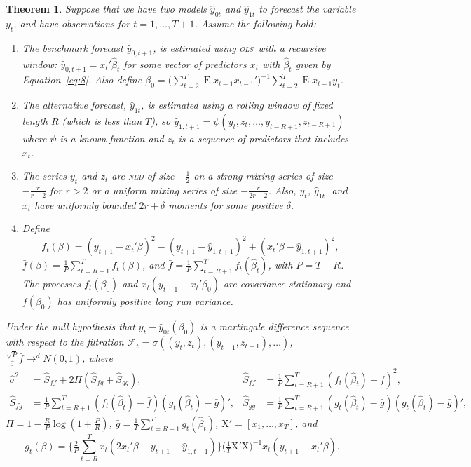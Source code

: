 \documentclass[10pt,fleqn,draft]{article}
\newtheorem{thm}{Theorem}
\theoremstyle{definition}
\DeclareMathOperator{\E}{E}
\newcommand{\X}{\ensuremath{\mathrm{X}}}
\newcommand{\ned}{\textsc{ned}}
\newcommand{\ols}{\textsc{ols}}
\begin{document}
\begin{thm}\label{res:1}
  Suppose that we have two models $\hat{y}_{0t}$ and $\hat{y}_{1t}$ to
  forecast the variable $y_t$, and have observations for
  $t=1,\dots,T+1$.  Assume the following hold:
  \begin{enumerate}
  \item \label{item:1} The benchmark forecast $\hat{y}_{0,t+1}$, is
    estimated using \ols\ with a recursive window: $\hat{y}_{0,t+1} =
    x_t'\hat{\beta}_t$ for some vector of predictors $x_t$ with
    $\hat{\beta}_t$ given by Equation~\eqref{eq:8}.  Also define
    $\beta_0 = \big(\sum_{t=2}^{T} \E x_{t-1} x_{t-1}'\big)^{-1}
    \sum_{t=2}^T \E x_{t-1} y_t$.
  \item \label{item:2} The alternative forecast, $\hat{y}_{1t}$, is
    estimated using a rolling window of fixed length $R$ (which is
    less than $T$), so $\hat{y}_{1,t+1} =
    \psi(y_t,z_t,\dots,y_{t-R+1}, z_{t-R+1})$ where $\psi$ is a known
    function and $z_t$ is a sequence of predictors that includes
    $x_t$.
  \item \label{item:3} The series $y_t$ and $z_t$ are \textsl{\ned} of size
    $-\frac12$ on a strong mixing series of size $-\frac{r}{r-2}$ for $r>2$ or a
    uniform mixing series of size $-\frac{r}{2r-2}$.  Also, $y_t$,
    $\hat{y}_{1t}$, and $x_t$ have uniformly bounded $2 r+\delta$
    moments for some positive $\delta$.
  \item \label{item:4} Define \[f_t(\beta) = (y_{t+1} - x_t'\beta)^2 -
    (y_{t+1} - \hat{y}_{1,t+1})^2 + (x_t'\beta - \hat{y}_{1,t+1})^2,\]
    $\bar{f}(\beta) = \tfrac1P \sum_{t=R+1}^T f_t(\beta)$, and $\bar f =
    \tfrac1P \sum_{t=R+1}^{T} f_t(\hat{\beta}_t)$, with $P = T - R$. The
    processes $f_t(\beta_0)$ and $x_t(y_{t+1} - x_t'\beta_0)$ are
    covariance stationary and $\bar f(\beta_0)$ has uniformly positive
    long run variance.
  \end{enumerate}
  Under the null hypothesis that $y_t - \hat{y}_{0t}(\beta_0)$ is a
  martingale difference sequence with respect to the filtration
  $\mathcal{F}_t = \sigma((y_t, z_{t}), (y_{t-1}, z_{t-1}),\dots)$,
  $\tfrac{\sqrt{P}}{\hat\sigma} \bar f \to^d N(0,1)$, where 
  \begin{align*}
    \hat{\sigma}^2 &= \hat{S}_{ff} + 2 \Pi (\hat{S}_{fg} + \hat{S}_{gg}), &
    \hat{S}_{ff} &= \tfrac1P \sum_{t=R+1}^T (f_t(\hat{\beta}_t) - \bar
    f)^2, \\
    \hat{S}_{fg} &= \tfrac1P \sum_{t=R+1}^T (f_t(\hat{\beta}_t) -
    \bar{f})(g_t(\hat{\beta}_t) - \bar g)', &
    \hat{S}_{gg} &= \tfrac1P \sum_{t=R+1}^T (g_t(\hat{\beta}_t) - \bar
    g)(g_t(\hat{\beta}_t) - \bar g)',
  \end{align*}
  $\Pi = 1 - \tfrac{R}{P} \log(1 + \tfrac{P}{R})$, $\bar{g} = \tfrac1T
  \sum_{t=R+1}^T g_t(\hat{\beta}_t)$, $\X' = [x_1,\dots,x_T]$, and
  \begin{equation*}
    g_t(\beta) = \Big\{\tfrac{2}{P}\sum_{t=R}^T x_t (2 x_t'\beta -
    y_{t+1} - \hat{y}_{1,t+1}) \Big\} \big(\tfrac1T \X'\X \big)^{-1}
    x_t(y_{t+1} - x_t'\beta).
  \end{equation*}
\end{thm}
\end{document}
